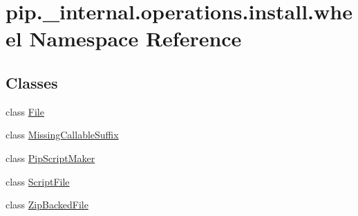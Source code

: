 \hypertarget{namespacepip_1_1__internal_1_1operations_1_1install_1_1wheel}{}\section{pip.\+\_\+internal.\+operations.\+install.\+wheel Namespace Reference}
\label{namespacepip_1_1__internal_1_1operations_1_1install_1_1wheel}
\subsection*{Classes}
\begin{DoxyCompactItemize}
\item 
class \hyperlink{classpip_1_1__internal_1_1operations_1_1install_1_1wheel_1_1File}{File}
\item 
class \hyperlink{classpip_1_1__internal_1_1operations_1_1install_1_1wheel_1_1MissingCallableSuffix}{Missing\+Callable\+Suffix}
\item 
class \hyperlink{classpip_1_1__internal_1_1operations_1_1install_1_1wheel_1_1PipScriptMaker}{Pip\+Script\+Maker}
\item 
class \hyperlink{classpip_1_1__internal_1_1operations_1_1install_1_1wheel_1_1ScriptFile}{Script\+File}
\item 
class \hyperlink{classpip_1_1__internal_1_1operations_1_1install_1_1wheel_1_1ZipBackedFile}{Zip\+Backed\+File}
\end{DoxyCompactItemize}
